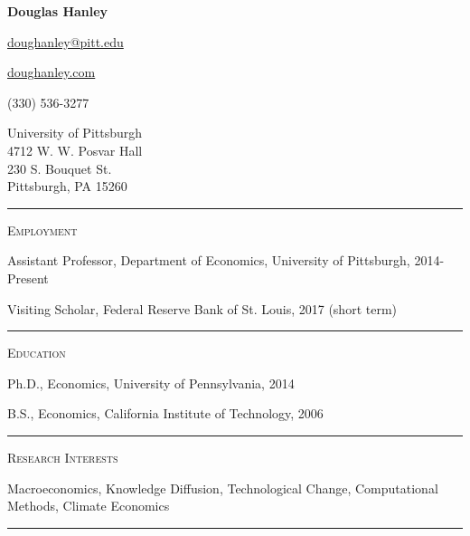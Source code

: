 \documentclass{article}
\begin{document}
\thispagestyle{empty}

\begin{center}
{\LARGE \textbf{Douglas Hanley}}
\end{center}

\begin{center}
\parbox{2.0in}{
\begin{flushright}
\href{mailto:doughanley@pitt.edu}{doughanley@pitt.edu} 

\href{http://doughanley.com/}{doughanley.com} 

(330) 536-3277
\end{flushright}
}
\hspace{0.5cm}
\parbox{2.0in}{
University of Pittsburgh \\
4712 W. W. Posvar Hall \\
230 S. Bouquet St. \\
Pittsburgh, PA 15260
}
\end{center}

\hspace{-0.025\textwidth}\rule{1.05\textwidth}{0.1mm}

\vspace{0.3cm}


\parbox{\textwidth}{
\parbox[t]{0.28\textwidth}{ \raggedright \noindent \textsc{ Employment } }
\parbox[t]{0.72\textwidth}{ \raggedright

Assistant Professor, Department of Economics, University of Pittsburgh, 2014-Present
\vspace{0.27cm}

Visiting Scholar, Federal Reserve Bank of St. Louis, 2017 (short term)
\vspace{0.27cm}

}
\textcolor{light-gray}{\hrule}
}
\vspace{0.3cm}

\parbox{\textwidth}{
\parbox[t]{0.28\textwidth}{ \raggedright \noindent \textsc{ Education } }
\parbox[t]{0.72\textwidth}{ \raggedright

Ph.D., Economics, University of Pennsylvania, 2014
\vspace{0.27cm}

B.S., Economics, California Institute of Technology, 2006
\vspace{0.27cm}

}
\textcolor{light-gray}{\hrule}
}
\vspace{0.3cm}

\parbox{\textwidth}{
\parbox[t]{0.28\textwidth}{ \raggedright \noindent \textsc{ Research Interests } }
\parbox[t]{0.72\textwidth}{ \raggedright

Macroeconomics, Knowledge Diffusion, Technological Change, Computational Methods, Climate Economics
\vspace{0.27cm}

}
\textcolor{light-gray}{\hrule}
}
\vspace{0.3cm}
\end{document}
